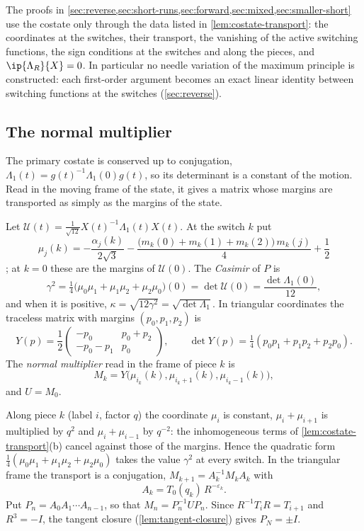 The proofs in \cref{sec:reverse,sec:short-runs,sec:forward,sec:mixed,sec:smaller-short} use the
costate only through the data listed in \cref{lem:costate-transport}: the coordinates at the
switches, their transport, the vanishing of the active switching functions, the sign conditions
at the switches and along the pieces, and $\ip{\Lambda_R}{X}=0$. In particular no needle
variation of the maximum principle is constructed: each first-order argument becomes an exact
linear identity between switching functions at the switches (\cref{sec:reverse}).

\subsection{The normal multiplier}\label{sec:per-multiplier}

The primary costate is conserved up to conjugation, $\Lambda_1(t)=g(t)^{-1}\Lambda_1(0)g(t)$, so its determinant is a constant of the motion. Read in
the moving frame of the state, it gives a matrix whose margins are transported as simply as the
margins of the state.

\begin{definition}\label{def:normal-multiplier}
Let $\mathcal U(t)=\frac{1}{\sqrt{12}}X(t)^{-1}\Lambda_1(t)X(t)$. At the switch $k$ put
\[
  \mu_j(k)=-\frac{\alpha_j(k)}{2\sqrt3}-\frac{\bigl(m_k(0)+m_k(1)+m_k(2)\bigr)\,m_k(j)}{4}+\frac12
\]; at $k=0$ these are the margins of $\mathcal U(0)$. The \emph{Casimir} of $P$ is
\[
  \gamma^2=\tfrac14\bigl(\mu_0\mu_1+\mu_1\mu_2+\mu_2\mu_0\bigr)(0)=\det\mathcal U(0)
  =\frac{\det\Lambda_1(0)}{12},
\]
and when it is positive, $\kappa=\sqrt{12\gamma^2}=\sqrt{\det\Lambda_1}$. In triangular coordinates the traceless matrix with margins
$(p_0,p_1,p_2)$ is
\[
  Y(p)=\frac12\begin{pmatrix}-p_0&p_0+p_2\\-p_0-p_1&p_0\end{pmatrix},\qquad
  \det Y(p)=\tfrac14(p_0p_1+p_1p_2+p_2p_0).
\]
The \emph{normal multiplier} read in the frame of piece $k$ is
\[
  M_k=Y\bigl(\mu_{i_k}(k),\mu_{i_k+1}(k),\mu_{i_k-1}(k)\bigr),
\]
and $U=M_0$.
\end{definition}

Along piece $k$ (label $i$, factor $q$) the coordinate $\mu_i$ is constant, $\mu_i+\mu_{i+1}$ is
multiplied by $q^2$ and $\mu_i+\mu_{i-1}$ by $q^{-2}$: the inhomogeneous terms of
\cref{lem:costate-transport}(b) cancel against those of the margins. Hence the quadratic form
$\frac14(\mu_0\mu_1+\mu_1\mu_2+\mu_2\mu_0)$ takes the value $\gamma^2$ at every switch. In the triangular frame the transport is a conjugation,
$M_{k+1}=A_k^{-1}M_kA_k$ with
\[
  A_k=T_0(q_k)\,R^{-\varepsilon_k}.
\]
Put $P_n=A_0A_1\cdots A_{n-1}$, so
that $M_n=P_n^{-1}UP_n$. Since $R^{-1}T_iR=T_{i+1}$ and $R^3=-I$, the tangent closure
(\cref{lem:tangent-closure}) gives $P_N=\pm I$.

